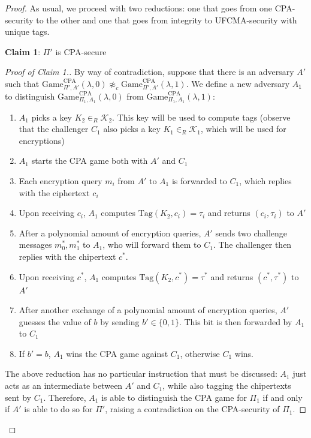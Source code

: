 \documentclass[a4paper, 12pt]{report}
\begin{document}
    \begin{proof}
        As usual, we proceed with two reductions: one that goes from one CPA-security to the other and one that goes from integrity to UFCMA-security with unique tags.

        \textbf{Claim 1}: $\Pi'$ is CPA-secure

        \begin{proof}[Proof of Claim 1.]
            By way of contradiction, suppose that there is an adversary $A'$ such that $\mathrm{Game}_{\Pi', A'}^{\text{CPA}}(\lambda,0) \not\approx_c \mathrm{Game}_{\Pi', A'}^{\text{CPA}}(\lambda,1)$. We define a new adversary $A_1$ to distinguish $\mathrm{Game}_{\Pi_1, A_1}^{\text{CPA}}(\lambda,0)$ from $\mathrm{Game}_{\Pi_1, A_1}^{\text{CPA}}(\lambda,1)$:
            \begin{enumerate}
                \item $A_1$ picks a key $K_2 \in_R \mathcal{K}_2$. This key will be used to compute tags (observe that the challenger $C_1$ also picks a key $K_1 \in_R \mathcal{K}_1$, which will be used for encryptions)
                \item $A_1$ starts the CPA game both with $A'$ and $C_1$
                \item Each encryption query $m_i$ from $A'$ to $A_1$ is forwarded to $C_1$, which replies with the ciphertext $c_i$
                \item Upon receiving $c_i$, $A_1$ computes $\mathrm{Tag}(K_2, c_i) = \tau_i$ and returns $(c_i, \tau_i)$ to $A'$
                \item After a polynomial amount of encryption queries, $A'$ sends two challenge messages $m_0^*, m_1^*$ to $A_1$, who will forward them to $C_1$. The challenger then replies with the chipertext $c^*$.
                \item Upon receiving $c^*$, $A_1$ computes $\mathrm{Tag}(K_2, c^*) = \tau^*$ and returns $(c^*, \tau^*)$ to $A'$
                \item After another exchange of a polynomial amount of encryption queries, $A'$ guesses the value of $b$ by sending $b' \in \{0,1\}$. This bit is then forwarded by $A_1$ to $C_1$
                \item If $b' = b$, $A_1$ wins the CPA game against $C_1$, otherwise $C_1$ wins.
            \end{enumerate}

            The above reduction has no particular instruction that must be discussed: $A_1$ just acts as an intermediate between $A'$ and $C_1$, while also tagging the chipertexts sent by $C_1$. Therefore, $A_1$ is able to distinguish the CPA game for $\Pi_1$ if and only if $A'$ is able to do so for $\Pi'$, raising a contradiction on the CPA-security of $\Pi_1$.  
        \end{proof}


\end{proof}
\end{document}
